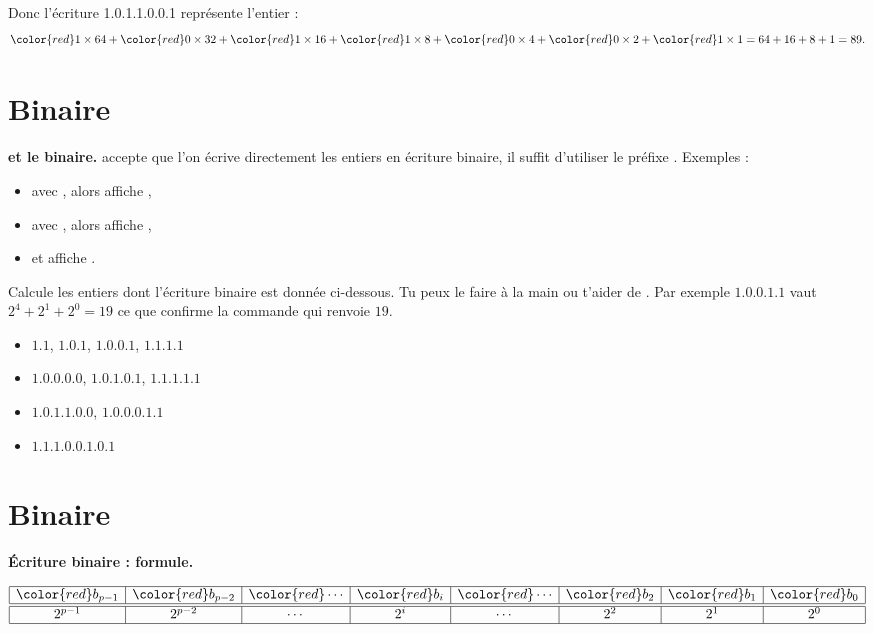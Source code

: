 \documentclass[11pt,class=report,crop=false]{standalone}
\begin{document}
    Donc l'écriture {\color{red}1}.{\color{red}0}.{\color{red}1}.{\color{red}1}.{\color{red}0}.{\color{red}0}.{\color{red}1} représente l'entier : 
    $${\color{red}1} \times 64  + {\color{red}0} \times 32 + {\color{red}1} \times 16  + {\color{red}1} \times 8 + {\color{red}0} \times 4 + {\color{red}0} \times 2 + {\color{red}1} \times 1 = 64 + 16 + 8 + 1 = 89.$$
    
\newpage

  \section*{Binaire}
  
 \textbf{\Python{} et le binaire.} \Python{} accepte que l'on écrive directement les entiers en écriture binaire, il suffit d'utiliser le préfixe \og{}\fg{}.
    Exemples :
    \begin{itemize}
      \item avec , alors  affiche ,
      \item avec , alors  affiche ,
      \item et  affiche .
    \end{itemize}    
    
   
\bigskip 
    
  Calcule les entiers dont l'écriture binaire est donnée ci-dessous. Tu peux le faire à la main ou t'aider de \Python. Par exemple $1.0.0.1.1$ vaut $2^4+2^1+2^0 = 19$ ce que confirme la commande  qui renvoie $19$.
  
  \begin{itemize}
    \item $1.1$, $1.0.1$, $1.0.0.1$, $1.1.1.1$
    \item $1.0.0.0.0$, $1.0.1.0.1$, $1.1.1.1.1$
    \item $1.0.1.1.0.0$, $1.0.0.0.1.1$
    \item $1.1.1.0.0.1.0.1$
  \end{itemize} 
  
    
\newpage

  \section*{Binaire}
     

 \textbf{\'Ecriture binaire : formule.} 
 
 
  $$
\begin{array}{|c|c|c|c|c|c|c|c|}
  \hline
  {\color{red}b_{p-1}} & {\color{red}b_{p-2}}& {\color{red}\cdots} & {\color{red}b_i}& {\color{red}\cdots} & {\color{red}b_2} & {\color{red}b_1} & {\color{red}b_0} \\ 
  \hline\hline
  2^{p-1} & 2^{p-2} & \cdots & 2^i &\cdots & 2^2 & 2^1 & 2^0 \\
  \hline
\end{array}
$$   
  
\end{document}
